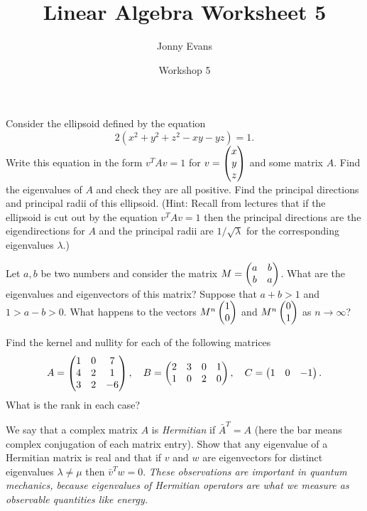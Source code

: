 \documentclass{article}
\title{Linear Algebra Worksheet 5}
\author{Jonny Evans}
\date{Workshop 5}
\begin{document}
\maketitle
\setcounter{section}{5}


\begin{Exercise}\label{exr:ellipsoid}
Consider the ellipsoid defined by the equation
\[2(x^2+y^2+z^2-xy-yz)=1.\] Write this equation in the form
\(v^TAv=1\) for \(v=\begin{pmatrix} x\\y\\z\end{pmatrix}\) and some matrix \(A\). Find the
eigenvalues of \(A\) and check they are all positive. Find the
principal directions and principal radii of this ellipsoid. (Hint:
Recall from lectures that if the ellipsoid is cut out by the
equation \(v^TAv=1\) then the principal directions are the
eigendirections for \(A\) and the principal radii are
\(1/\sqrt{\lambda}\) for the corresponding eigenvalues \(\lambda\).)


\end{Exercise}
\begin{Exercise}
Let \(a,b\) be two numbers and consider the matrix \(M=\begin{pmatrix} a & b
\\ b & a \end{pmatrix}\). What are the eigenvalues and eigenvectors of this
matrix? Suppose that \(a+b>1\) and \(1>a-b>0\). What happens to the
vectors \(M^n\begin{pmatrix} 1 \\ 0\end{pmatrix}\) and \(M^n\begin{pmatrix} 0 \\ 1\end{pmatrix}\) as
\(n\to\infty\)?


\end{Exercise}
\begin{Exercise}
Find the kernel and nullity for each of the following matrices
\[A=\begin{pmatrix} 1 & 0 & 7 \\ 4 & 2 & 1\\ 3 & 2 & -6\end{pmatrix},\quad B=\begin{pmatrix} 2 & 3 & 0
& 1 \\ 1 & 0 & 2 & 0\end{pmatrix},\quad C=\begin{pmatrix} 1 & 0 & -1\end{pmatrix}.\]
What is the rank in each case?


\end{Exercise}
\begin{Exercise}\label{exr:hermitian}
We say that a complex matrix \(A\) is {\em Hermitian} if
\(\bar{A}^T=A\) (here the bar means complex conjugation of each
matrix entry). Show that any eigenvalue of a Hermitian matrix is
real and that if \(v\) and \(w\) are eigenvectors for distinct
eigenvalues \(\lambda\neq\mu\) then \(\bar{v}^Tw=0\). {\em These
observations are important in quantum mechanics, because eigenvalues
of Hermitian operators are what we measure as observable quantities
like energy.}


\end{Exercise}
\end{document}
